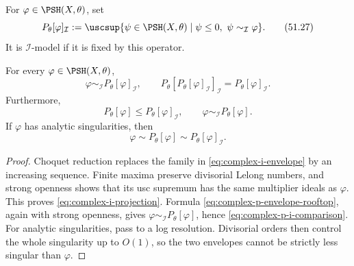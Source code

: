 \begin{definition}
\label{def:complex-i-envelope}
For \(\varphi\in\PSH(X,\theta)\), set
\[
 P_\theta[\varphi]_{\mathcal I}
 :=\uscsup\{\psi\in\PSH(X,\theta)\mid
          \psi\leq0,\ \psi\sim_{\mathcal I}\varphi\}.
\tag{51.27}\label{eq:complex-i-envelope}
\]
It is \(\mathcal I\)-model if it is fixed by this operator.
\end{definition}

\begin{theorem}\label{thm:complex-i-projection}
For every \(\varphi\in\PSH(X,\theta)\),
\[
 \varphi\sim_{\mathcal I}P_\theta[\varphi]_{\mathcal I},
\qquad
 P_\theta[P_\theta[\varphi]_{\mathcal I}]_{\mathcal I}
      =P_\theta[\varphi]_{\mathcal I}.
\tag{51.28}\label{eq:complex-i-projection}
\]
Furthermore,
\[
 P_\theta[\varphi]\leq P_\theta[\varphi]_{\mathcal I},
\qquad
 \varphi\sim_{\mathcal I}P_\theta[\varphi].
\tag{51.29}\label{eq:complex-p-i-comparison}
\]
If \(\varphi\) has analytic singularities, then
\[
 \varphi\sim P_\theta[\varphi]
        \sim P_\theta[\varphi]_{\mathcal I}.
\tag{51.30}\label{eq:complex-analytic-envelope-agreement}
\]
\end{theorem}

\begin{proof}
Choquet reduction replaces the family in
\eqref{eq:complex-i-envelope} by an increasing sequence.  Finite maxima
preserve divisorial Lelong numbers, and strong openness shows that its
usc supremum has the same multiplier ideals as \(\varphi\).  This proves
\eqref{eq:complex-i-projection}.  Formula
\eqref{eq:complex-p-envelope-rooftop}, again with strong openness, gives
\(\varphi\sim_{\mathcal I}P_\theta[\varphi]\), hence
\eqref{eq:complex-p-i-comparison}.  For analytic singularities, pass to
a log resolution.  Divisorial orders then control the whole singularity
up to \(O(1)\), so the two envelopes cannot be strictly less singular
than \(\varphi\).
\end{proof}
